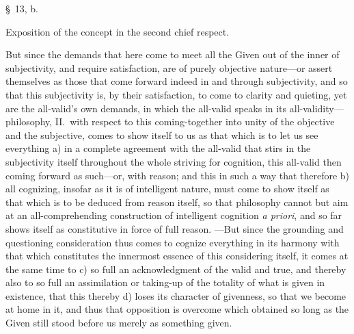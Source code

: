 \documentclass[12pt,a4paper]{book}
\begin{document}
\begin{center}\large\S~13, b.\end{center}
\begin{center}Exposition of the concept in the second chief respect.\end{center}

But since the demands that here come to meet all the Given out of the inner of
subjectivity, and require satisfaction, are of purely objective nature---or assert
themselves as those that come forward indeed in and through subjectivity, and so
that this subjectivity is, by their satisfaction, to come to clarity and quieting,
yet are the all-valid's own demands, in which the all-valid speaks in its
all-validity---philosophy, II.~with respect to this coming-together into unity of
the objective and the subjective, comes to show itself to us as that which is to
let us see everything a) in a complete agreement with the all-valid that stirs in
the subjectivity itself throughout the whole striving for cognition, this all-valid
then coming forward as such---or, with reason; and this in such a way that
therefore b) all cognizing, insofar as it is of intelligent nature, must come to
show itself as that which is to be deduced from reason itself, so that philosophy
cannot but aim at an all-comprehending construction of intelligent cognition
\textit{a priori}, and so far shows itself as constitutive in force of full reason.
---But since the grounding and questioning consideration thus comes to cognize
everything in its harmony with that which constitutes the innermost essence of this
considering itself, it comes at the same time to c) so full an acknowledgment of
the valid and true, and thereby also to so full an assimilation or taking-up of the
totality of what is given in existence, that this thereby d) loses its character of
givenness, so that we become at home in it, and thus that opposition is overcome
which obtained so long as the Given still stood before us merely as something given.
\end{document}
